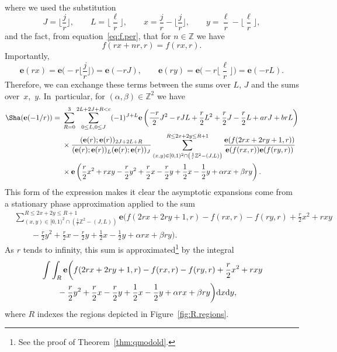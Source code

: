 \documentclass[pdftex]{sigma}
\numberwithin{equation}{section}
\def\BZ{\mathbb{Z}}
\def\e{\mathbf e}
\def\WRT{\Sha}
\def\BZ{\mathbb Z}
\begin{document}
where we used the substitution
\[
 J =\biggl\lfloor\frac{j}{r}\biggr\rfloor,\qquad
 L =\biggl\lfloor\frac{\ell}{r}\biggr\rfloor,\qquad
 x =\frac{j}{r}-\biggl\lfloor \frac{j}{r}\biggr\rfloor,\qquad
 y =\frac{\ell}{r}-\biggl\lfloor \frac{\ell}{r}\biggr\rfloor ,
\]
and the fact, from equation~\eqref{eq:f.per}, that for $n\in\BZ$ we have
\[
 f(rx+nr,r) =f(rx,r).
\]
Importantly,
\[
 \e(rx) =\e\biggl(-r\bigg\lfloor\frac{j}{r}\bigg\rfloor\biggr) =\e(-rJ),
 \qquad
 \e(ry) =\e\biggl(-r\bigg\lfloor\frac{\ell}{r}\bigg\rfloor\biggr) =\e(-rL) .
\]
Therefore, we can exchange these terms between the sums over $L$, $J$ and the sums over~$x$,~$y$. In~particular, for $(\alpha,\beta)\in\BZ^2$ we have
\begin{align*}
\WRT(\e(-1/r)) ={}&\sum_{R=0}^{3}\sum_{0\leq L,0\leq J}^{2L+2J+R<c}(-1)^{J+L}\e\left(\frac{-r}{2}J^2-rJL+\frac{r}{2}L^2+\frac{r}{2}J-\frac{r}{2}L+arJ+brL\right)\\
 & \times \frac{(\e(r);\e(r))_{2J+2L+R}}{(\e(r);\e(r))_{L}(\e(r);\e(r))_{J}}
 \sum_{(x,y)\in[0,1)^2\cap\left(\frac{1}{r}\BZ^2-(J,L)\right)}^{R\leq2x+2y\leq R+1}
 \frac{\e(f(2rx+2ry+1,r))}{\e(f(rx,r))\e(f(ry,r))}\\
& \times \e\left(\frac{r}{2}x^2+rxy-\frac{r}{2}y^2+\frac{r}{2}x-\frac{r}{2}y+\frac{1}{2}x-\frac{1}{2}y+\alpha rx+\beta ry\right) .
\end{align*}
This form of the expression makes it clear the asymptotic expansions come from a stationary phase approximation applied to the sum
\begin{align}
& \sum_{(x,y)\in[0,1)^2\cap\left(\frac{1}{r}\BZ^2-(J,L)\right)}^{R\leq2x+2y\leq R+1}
 \e\biggl(f(2rx+2ry+1,r)-f(rx,r)-f(ry,r)+\frac{r}{2}x^2+rxy\nonumber\\
& \qquad{}-\frac{r}{2}y^2+\frac{r}{2}x-\frac{r}{2}y+\frac{1}{2}x-\frac{1}{2}y+\alpha rx+\beta ry\biggr).\label{eq:dostat}
\end{align}
As $r$ tends to infinity, this sum is approximated\footnote{See the proof of Theorem~\ref{thm:qmodold}.} by the integral
\begin{align*}
 &\int\int_{R}\e\biggl(f(2rx+2ry+1,r)-f(rx,r)-f(ry,r)+\frac{r}{2}x^2+rxy\\
& \qquad {}-\frac{r}{2}y^2+\frac{r}{2}x-\frac{r}{2}y+\frac{1}{2}x-\frac{1}{2}y+\alpha rx+\beta ry\biggr)  {\rm d}x{\rm d}y ,
\end{align*}
where $R$ indexes the regions depicted in Figure~\ref{fig:R.regions}.
\end{document}
